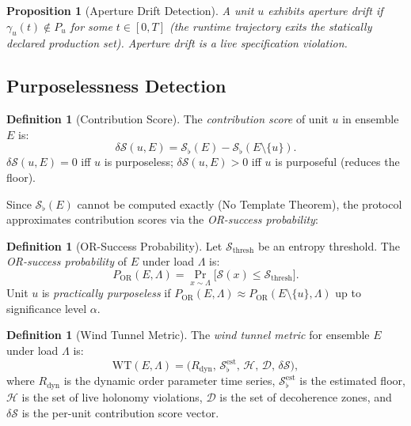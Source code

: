 \documentclass[twocolumn,a4paper,11pt]{article}
\theoremstyle{plain}
\newtheorem{proposition}[theorem]{Proposition}
\theoremstyle{definition}
\newtheorem{definition}[theorem]{Definition}
\theoremstyle{remark}
\DeclareMathOperator{\OR}{OR}
\newcommand{\Sflat}{\mathcal{S}_{\flat}}
\begin{document}
\begin{proposition}[Aperture Drift Detection]
\label{prop:aperture-drift}
A unit $u$ exhibits \emph{aperture drift} if $\gamma_u(t) \notin P_u$
for some $t \in [0,T]$ (the runtime trajectory exits the statically
declared production set). Aperture drift is a live specification violation.
\end{proposition}

\subsection{Purposelessness Detection}

\begin{definition}[Contribution Score]
\label{def:contribution}
The \emph{contribution score} of unit $u$ in ensemble $E$ is:
\[
  \delta\mathcal{S}(u, E) = \Sflat(E) - \Sflat(E \setminus \{u\}).
\]
$\delta\mathcal{S}(u, E) = 0$ iff $u$ is purposeless;
$\delta\mathcal{S}(u, E) > 0$ iff $u$ is purposeful (reduces the floor).
\end{definition}

Since $\Sflat(E)$ cannot be computed exactly (No Template Theorem), the
protocol approximates contribution scores via the \emph{OR-success
probability}:

\begin{definition}[OR-Success Probability]
\label{def:or-success}
Let $\mathcal{S}_\mathrm{thresh}$ be an entropy threshold. The
\emph{OR-success probability} of $E$ under load $\Lambda$ is:
\[
  P_\OR(E, \Lambda) = \Pr_{x \sim \Lambda}\!\bigl[\mathcal{S}(x)
  \leq \mathcal{S}_\mathrm{thresh}\bigr].
\]
Unit $u$ is \emph{practically purposeless} if
$P_\OR(E, \Lambda) \approx P_\OR(E \setminus \{u\}, \Lambda)$
up to significance level $\alpha$.
\end{definition}

\begin{definition}[Wind Tunnel Metric]
\label{def:wt-metric}
The \emph{wind tunnel metric} for ensemble $E$ under load $\Lambda$ is:
\[
  \mathrm{WT}(E, \Lambda) = \bigl(R_\mathrm{dyn},\,
  \mathcal{S}_\flat^\mathrm{est},\, \mathcal{H},\, \mathcal{D},\,
  \delta\mathcal{S}\bigr),
\]
where $R_\mathrm{dyn}$ is the dynamic order parameter time series,
$\mathcal{S}_\flat^\mathrm{est}$ is the estimated floor, $\mathcal{H}$
is the set of live holonomy violations, $\mathcal{D}$ is the set of
decoherence zones, and $\delta\mathcal{S}$ is the per-unit contribution
score vector.
\end{definition}
\end{document}
